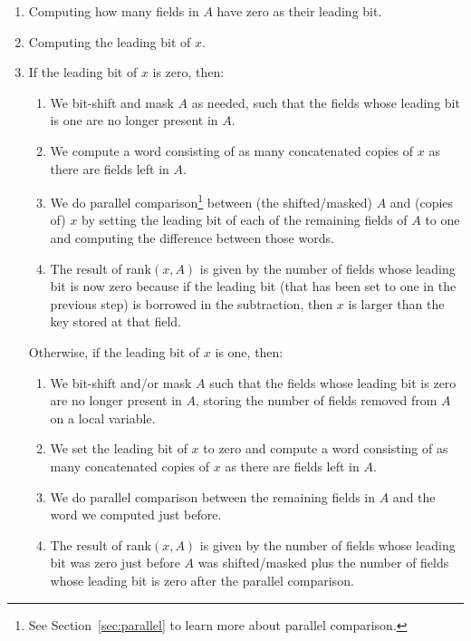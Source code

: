 \begin{enumerate}
    \item
    Computing how many fields in $A$ have zero as their leading bit.
    
    \item
    Computing the leading bit of $x$.
    
    \item
    If the leading bit of $x$ is zero, then:
    \begin{enumerate}
        \item
        We bit-shift and mask $A$ as needed, such that the fields whose leading bit is one are no longer present in $A$.
        
        \item
        We compute a word consisting of as many concatenated copies of $x$ as there are fields left in $A$.
        
        \item
        We do parallel comparison\footnote{See Section~\ref{sec:parallel} to learn more about parallel comparison.} between (the shifted/masked) $A$ and (copies of) $x$ by setting the leading bit of each of the remaining fields of $A$ to one and computing the difference between those words.
        
        \item
        The result of rank$(x,A)$ is given by the number of fields whose leading bit is now zero because if the leading bit (that has been set to one in the previous step) is borrowed in the subtraction, then $x$ is larger than the key stored at that field.
    \end{enumerate}
    
    Otherwise, if the leading bit of $x$ is one, then:
    \begin{enumerate}
        \item
        We bit-shift and/or mask $A$ such that the fields whose leading bit is zero are no longer present in $A$, storing the number of fields removed from $A$ on a local variable.
        
        \item
		We set the leading bit of $x$ to zero and compute a word consisting of as many concatenated copies of $x$ as there are fields left in $A$.
		
		\item
        We do parallel comparison between the remaining fields in $A$ and the word we computed just before.
        
        \item
        The result of rank$(x,A)$ is given by the number of fields whose leading bit was zero just before $A$ was shifted/masked plus the number of fields whose leading bit is zero after the parallel comparison.
    \end{enumerate}
    
\end{enumerate}

